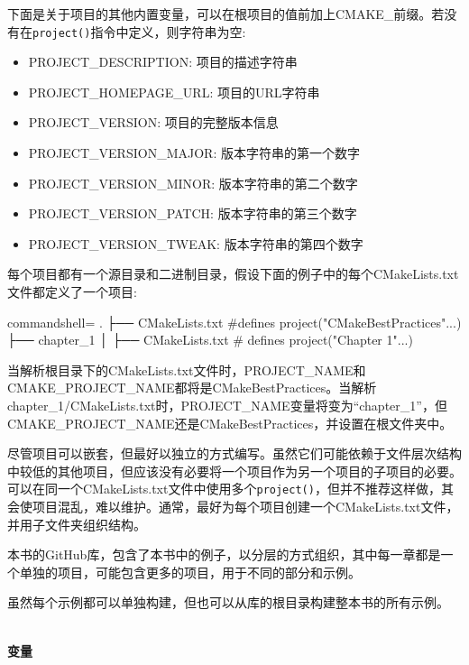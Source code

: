 下面是关于项目的其他内置变量，可以在根项目的值前加上CMAKE\_前缀。若没有在\texttt{project()}指令中定义，则字符串为空:

\begin{itemize}
\item 
PROJECT\_DESCRIPTION: 项目的描述字符串

\item 
PROJECT\_HOMEPAGE\_URL: 项目的URL字符串

\item 
PROJECT\_VERSION: 项目的完整版本信息

\item 
PROJECT\_VERSION\_MAJOR: 版本字符串的第一个数字

\item 
PROJECT\_VERSION\_MINOR: 版本字符串的第二个数字

\item 
PROJECT\_VERSION\_PATCH: 版本字符串的第三个数字

\item 
PROJECT\_VERSION\_TWEAK: 版本字符串的第四个数字
\end{itemize}

每个项目都有一个源目录和二进制目录，假设下面的例子中的每个CMakeLists.txt文件都定义了一个项目:

\begin{tcblisting}{commandshell={}}
.
├── CMakeLists.txt #defines project("CMakeBestPractices"...)
├── chapter_1
│      ├── CMakeLists.txt # defines project("Chapter 1"...)
\end{tcblisting}

当解析根目录下的CMakeLists.txt文件时，PROJECT\_NAME和CMAKE\_PROJECT\_NAME都将是CMakeBestPractices。当解析chapter\_1/CMakeLists.txt时，PROJECT\_NAME变量将变为“chapter\_1”，但CMAKE\_PROJECT\_NAME还是CMakeBestPractices，并设置在根文件夹中。

尽管项目可以嵌套，但最好以独立的方式编写。虽然它们可能依赖于文件层次结构中较低的其他项目，但应该没有必要将一个项目作为另一个项目的子项目的必要。可以在同一个CMakeLists.txt文件中使用多个\texttt{project()}，但并不推荐这样做，其会使项目混乱，难以维护。通常，最好为每个项目创建一个CMakeLists.txt文件，并用子文件夹组织结构。

本书的GitHub库，包含了本书中的例子，以分层的方式组织，其中每一章都是一个单独的项目，可能包含更多的项目，用于不同的部分和示例。

虽然每个示例都可以单独构建，但也可以从库的根目录构建整本书的所有示例。

\hspace*{\fill} \\ %
\noindent
\textbf{变量}

